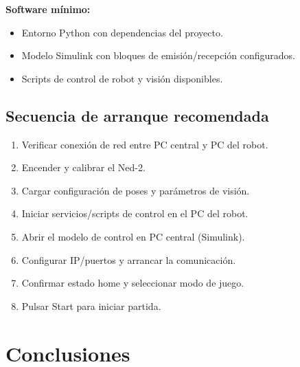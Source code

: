 \documentclass[12pt,a4paper]{article}
\begin{document}
\textbf{Software m\'inimo:}
\begin{itemize}
  \item Entorno Python con dependencias del proyecto.
  \item Modelo Simulink con bloques de emisi\'on/recepci\'on configurados.
  \item Scripts de control de robot y visi\'on disponibles.
\end{itemize}

\subsection{Secuencia de arranque recomendada}
\begin{enumerate}
  \item Verificar conexi\'on de red entre PC central y PC del robot.
  \item Encender y calibrar el Ned-2.
  \item Cargar configuraci\'on de poses y par\'ametros de visi\'on.
  \item Iniciar servicios/scripts de control en el PC del robot.
  \item Abrir el modelo de control en PC central (Simulink).
  \item Configurar IP/puertos y arrancar la comunicaci\'on.
  \item Confirmar estado home y seleccionar modo de juego.
  \item Pulsar Start para iniciar partida.
\end{enumerate}

\section{Conclusiones}
\end{document}
